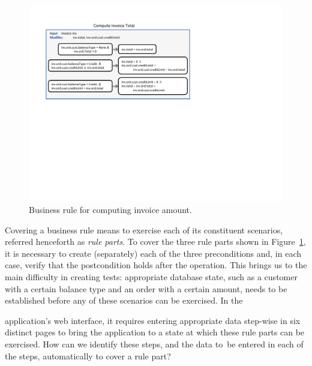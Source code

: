 \begin{figure}
\centering
\includegraphics[trim=55 320 286 54,clip,width=\columnwidth]{figs/invoice}
\vspace*{-18pt}
\caption{Business rule for computing invoice amount.}
\label{fig:invoice}
\end{figure}

Covering a business rule means to exercise each of its constituent scenarios,
referred henceforth as \textit{rule parts}.  To cover the three rule parts shown
in Figure~\ref{fig:invoice}, it is necessary to create (separately) each of the
three preconditions and, in each case, verify that the postcondition holds after
the operation.  This brings us to the main difficulty in creating tests:
appropriate database state, such as a customer with a certain balance type and
an order with a certain amount, needs to be established before any of these
scenarios can be exercised.  In the \subject{jBilling} application's web
interface, it requires entering appropriate data step-wise in six distinct pages
to bring the application to a state at which these rule parts can be exercised.
How can we identify these steps, and the data to~be entered in
each of the steps, automatically to cover a rule part?

